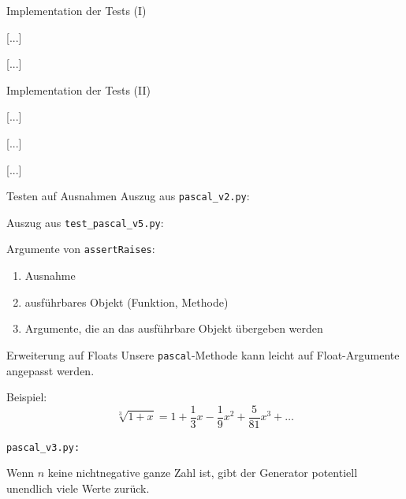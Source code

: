 \documentclass[t, utf8x, 10pt]{beamer}
\begin{document}
\begin{frame}{Implementation der Tests (I)}
 \begin{small}
  [...]
  
  [...]
  
  [...]
 \end{small}
\end{frame}


\begin{frame}{Implementation der Tests (II)}
 \begin{small}
  
  [...]
  
  [...]
  
  [...]
 \end{small}
\end{frame}


\begin{frame}{Testen auf Ausnahmen}
 Auszug aus \texttt{pascal\_v2.py}:
 \begin{small}
  
 \end{small}

 Auszug aus \texttt{test\_pascal\_v5.py}:
 \begin{small}
  
 \end{small}

 Argumente von \texttt{assertRaises}:
 \begin{enumerate}
  \item Ausnahme
  \item ausführbares Objekt (Funktion, Methode)
  \item Argumente, die an das ausführbare Objekt übergeben werden
 \end{enumerate}
\end{frame}


\begin{frame}{Erweiterung auf Floats}
 Unsere \texttt{pascal}-Methode kann leicht auf Float-Argumente angepasst werden.
 
 Beispiel:
 \begin{displaymath}
  \sqrt[3]{1+x} = 1+\frac{1}{3}x-\frac{1}{9}x^2+\frac{5}{81}x^3+\ldots
 \end{displaymath}

 \texttt{pascal\_v3.py:}
 

 Wenn $n$ keine nichtnegative ganze Zahl ist, gibt der Generator potentiell unendlich
 viele Werte zurück.
\end{frame}
\end{document}
